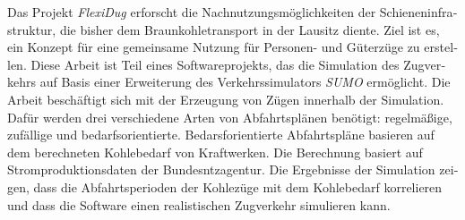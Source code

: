 
%
%



\null\vfil
\begin{otherlanguage}{ngerman}
\begin{center}\textsf{\textbf{\abstractname}}\end{center}

\noindent Das Projekt \emph{FlexiDug} erforscht die Nachnutzungsmöglichkeiten der Schieneninfrastruktur, die bisher dem Braunkohletransport in der Lausitz diente. Ziel ist es, ein Konzept für eine gemeinsame Nutzung für Personen- und Güterzüge zu erstellen. Diese Arbeit ist Teil eines Softwareprojekts, das die Simulation des Zugverkehrs auf Basis einer Erweiterung des Verkehrssimulators \emph{SUMO} ermöglicht. Die Arbeit beschäftigt sich mit der Erzeugung von Zügen innerhalb der Simulation. Dafür werden drei verschiedene Arten von Abfahrtsplänen benötigt: regelmäßige, zufällige und bedarfsorientierte. Bedarsforientierte Abfahrtspläne basieren auf dem berechneten Kohlebedarf von Kraftwerken. Die Berechnung basiert auf Stromproduktionsdaten der Bundesntzagentur. Die Ergebnisse der Simulation zeigen, dass die Abfahrtsperioden der Kohlezüge mit dem Kohlebedarf korrelieren und dass die Software einen realistischen Zugverkehr simulieren kann.

\end{otherlanguage}
\vfil\null




